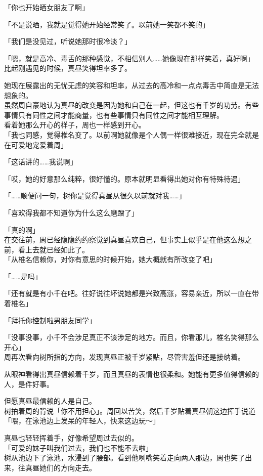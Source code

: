 「你也开始晒女朋友了啊」

「不是说晒，我就是觉得她开始经常笑了。以前她一笑都不笑的」

「我们是没见过，听说她那时很冷淡？」

「嗯，就是高冷、毒舌的那种感觉，不相信别人……她像现在那样笑着，真好啊」\\

比起刚遇见的时候，真昼笑得坦率多了。

她现在展露出的无忧无虑的笑容和坦率，从过去的高冷和一点点毒舌中简直是无法想象的。\\

虽然周自豪地认为真昼的改变是因为她和自己在一起，但这也有千岁的功劳。有些事情只有同性之间才能商量，也有些事情只有同性之间才能相互理解。\\

看着她那么开心的样子，周也一样感到开心。\\

「我也同感，觉得椎名变了。以前啊她就像是个人偶一样很难接近，现在完全就是在可爱地宠爱着周」

「这话讲的……我说啊」

「哎，她的好意那么纯粹，很好懂的。原本就明显看得出她对你有特殊待遇」

「……顺便问一句，树你是觉得真昼从很久以前就对我……」

「喜欢得我都不知道你为什么这么磨蹭了」

「真的啊」\\

在交往前，周已经隐隐约约察觉到真昼喜欢自己，但事实上似乎是在他这么想之前，看上去就已经如此了。\\

「从椎名信赖你，对你有意思的时候开始，她大概就有所改变了吧」

「……是吗」

「还有就是有小千在吧。往好说往坏说她都是兴致高涨，容易亲近，所以一直在带着椎名」

「拜托你控制啦男朋友同学」

「没事没事，小千不会涉足真正不该涉足的地方。而且，你看那儿，椎名笑得那么开心」\\

周再次看向树所指的方向，发现真昼正被千岁紧贴，尽管害羞但还是接纳着。

从眼神看得出真昼信赖着千岁，而且真昼的表情也很柔和。她能有更多值得信赖的人，是件好事。

但愿真昼最信赖的人是自己。\\

树拍着周的背说「你不用担心」。周回以苦笑，然后千岁贴着真昼朝这边挥手说道「喂，在泳池边上发呆的年轻人，快来这边玩～」

真昼也轻轻挥着手，好像希望周过去似的。\\

「可爱的妹子叫我们过去，我们也不能不去啦」\\

树从池边下了泳池，水浸到了腰部。看到他咧嘴笑着走向两人那边，周也笑了出来，往真昼她们的方向走去。
